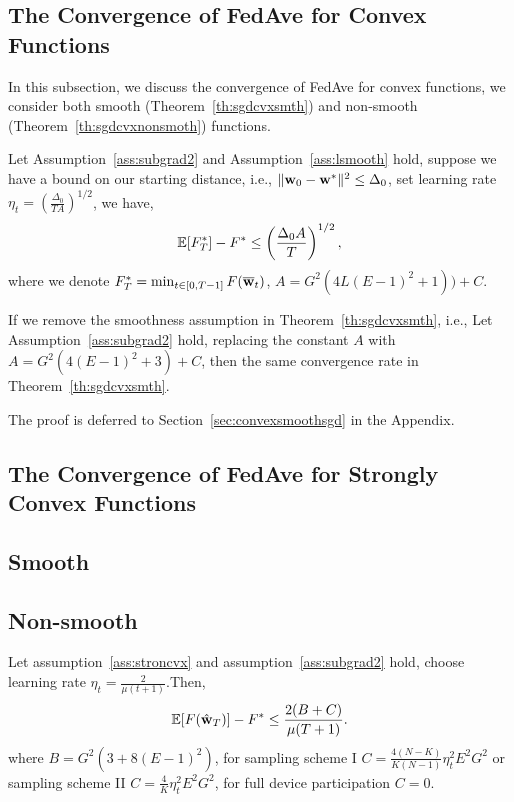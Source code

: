 \subsection{The Convergence of FedAve for Convex Functions}
In this subsection, we discuss the convergence of FedAve for convex functions,
we consider both smooth (Theorem~\ref{th:sgdcvxsmth}) and non-smooth (Theorem~\ref{th:sgdcvxnonsmoth})
functions. 

\begin{theorem}
Let Assumption~\ref{ass:subgrad2} and Assumption~\ref{ass:lsmooth} hold, suppose we have a bound 
on our starting distance, i.e., $\|{\mathbf{w}}_{0} - {\mathbf{w}}^*\|^2 \leq \Delta_0$, set learning rate $\eta_t =  \left(\frac{\Delta_0}{ T A}\right)^{1/2}$, we have,
$$\mathbb{E}[ F_T^*] - F^*  \leq \left(\frac{ \Delta_0 A }{T}\right)^{1/2},$$
where we denote $F^*_T = \min_{t \in [0, T-1]} F({\overline{\mathbf{w}}}_t)$, $A = G^2( 4L(E-1)^2 + 1)) + C$.
\label{th:sgdcvxsmth}
\end{theorem}

\begin{theorem}
If we remove the smoothness assumption in Theorem~\ref{th:sgdcvxsmth}, i.e., 
	Let Assumption~\ref{ass:subgrad2} hold, replacing the constant $A$ with $A=G^2 \left(4(E-1)^2 + 3\right) + C$, then the same convergence rate in Theorem~\ref{th:sgdcvxsmth}.
	\label{th:sgdcvxnonsmoth}
\end{theorem}
The proof is deferred to Section~\ref{sec:convexsmoothsgd} in the Appendix. 

\subsection{The Convergence of FedAve for Strongly Convex Functions}

\subsection{Smooth}
\cite{li2019convergence}

\subsection{Non-smooth}
\begin{theorem}
	Let assumption~\ref{ass:stroncvx} and assumption~\ref{ass:subgrad2} hold, choose learning rate $\eta_t = \frac{2}{\mu(t+1)} $.Then,
	\begin{align}
		\mathbb{E}[F(\hat{{\mathbf{w}}}_T)] - F^* \leq \frac{2(B + C)}{\mu(T+1)}.
	\end{align}
	where $B =  G^2 (3  + 8 (E-1)^2)$, for sampling scheme I $C =\frac{4(N - K)}{K(N-1)} \eta_t^2 E^2G^2 $ or
sampling scheme II $C = \frac{4}{K} \eta_t^2 E^2G^2$, for full device participation $C= 0$.
\end{theorem}


